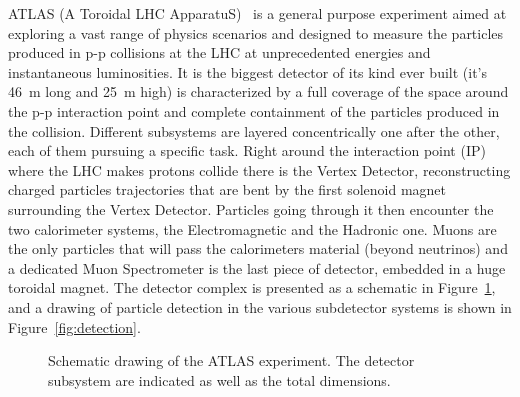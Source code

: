 ATLAS (A Toroidal LHC ApparatuS)~\cite{Aad:2008zzm} is a general purpose experiment
aimed at exploring a vast range of physics scenarios and designed to measure the particles
produced in p-p collisions at the LHC at unprecedented energies and instantaneous luminosities. 
It is the biggest detector of its kind ever built (it's 46~m long and 25~m high) is characterized by
a full coverage of the space around the p-p interaction point and complete
containment of the particles produced in the collision. Different subsystems are
layered concentrically one after the other, each of them pursuing a specific task. 
Right around the interaction point
(IP) where the LHC makes protons collide there is the Vertex Detector, reconstructing
charged particles trajectories that are bent by the first solenoid magnet surrounding
the Vertex Detector. Particles going through it then encounter the two calorimeter systems,
the Electromagnetic and the Hadronic one. Muons are the only particles that will pass
the calorimeters material (beyond neutrinos) and a dedicated Muon Spectrometer is the last
piece of detector, embedded in a huge toroidal magnet. The detector complex is presented
as a schematic in Figure~\ref{fig:atlas}, and a drawing of particle detection in the various
subdetector systems is shown in Figure~\ref{fig:detection}. 

\begin{figure}[htb]\begin{center}
	\caption{Schematic drawing of the ATLAS experiment. The detector subsystem are indicated as well as the total dimensions.\label{fig:atlas}}
\end{center}\end{figure}


